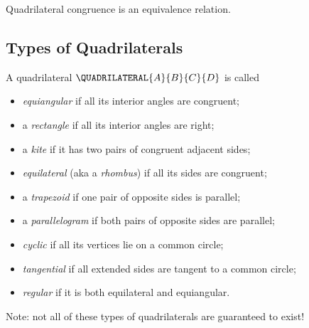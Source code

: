 \begin{prop}
Quadrilateral congruence is an equivalence relation.
\end{prop}

\subsection*{Types of Quadrilaterals}

\begin{dfn}
A quadrilateral \(\QUADRILATERAL{A}{B}{C}{D}\) is called
\begin{itemize}
\item \emph{equiangular} if all its interior angles are congruent;
\item a \emph{rectangle} if all its interior angles are right;
\item a \emph{kite} if it has two pairs of congruent adjacent sides;
\item \emph{equilateral} (aka a \emph{rhombus}) if all its sides are congruent;
\item a \emph{trapezoid} if one pair of opposite sides is parallel;
\item a \emph{parallelogram} if both pairs of opposite sides are parallel;
\item \emph{cyclic} if all its vertices lie on a common circle;
\item \emph{tangential} if all extended sides are tangent to a common circle;
\item \emph{regular} if it is both equilateral and equiangular.
\end{itemize}
\end{dfn}

Note: not all of these types of quadrilaterals are guaranteed to exist!


